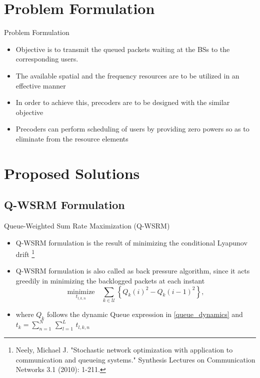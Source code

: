 \documentclass[10pt]{beamer}
\newcommand{\me}[1]{\( #1 \)}
\newcommand{\mc}[1]{\mathcal{#1}}
\begin{document}
\section{Problem Formulation}

\begin{frame}{Problem Formulation}
\begin{itemize}
\item Objective is to transmit the queued packets waiting at the \acsp{BS} to the corresponding users.
\item The available spatial and the frequency resources are to be utilized in an effective manner
\item In order to achieve this, precoders are to be designed with the similar objective
\item Precoders can perform scheduling of users by providing zero powers so as to eliminate from the resource elements
\end{itemize}
\end{frame}

\section{Proposed Solutions}

\subsection{\acs{Q-WSRM} Formulation}

\begin{frame}{Queue-Weighted Sum Rate Maximization (\acs{Q-WSRM})}
\begin{itemize}
\item \acs{Q-WSRM} formulation is the result of minimizing the conditional Lyapunov drift \footnote{Neely, Michael J. "Stochastic network optimization with application to communication and queueing systems." Synthesis Lectures on Communication Networks 3.1 (2010): 1-211.}
\item \acs{Q-WSRM} formulation is also called as back pressure algorithm, since it acts greedily in minimizing the backlogged packets at each instant
\[ \underset{t_{l,k,n}}{\text{minimize}} \quad \sum_{k \in \mc{U}} \left \lbrace Q_k(i)^2 - Q_k(i-1)^2 \right \rbrace, \]
\item where \me{Q_k} follows the dynamic Queue expression in \eqref{queue_dynamics} and \me{t_k = \sum_{n = 1}^N \, \sum_{l=1}^L \, t_{l,k,n}}
\end{itemize}
\end{frame}
\end{document}
